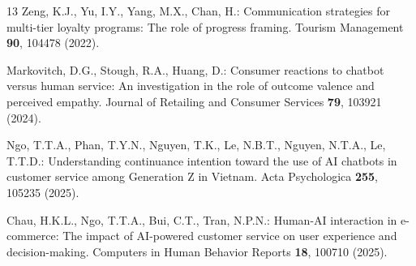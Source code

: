 \documentclass[runningheads]{llncs}
\begin{document}
\begin{thebibliography}{13}
Zeng, K.J., Yu, I.Y., Yang, M.X., Chan, H.: Communication strategies for multi-tier loyalty programs: The role of progress framing. Tourism Management \textbf{90}, 104478 (2022). 

Markovitch, D.G., Stough, R.A., Huang, D.: Consumer reactions to chatbot versus human service: An investigation in the role of outcome valence and perceived empathy. Journal of Retailing and Consumer Services \textbf{79}, 103921 (2024). 

Ngo, T.T.A., Phan, T.Y.N., Nguyen, T.K., Le, N.B.T., Nguyen, N.T.A., Le, T.T.D.: Understanding continuance intention toward the use of AI chatbots in customer service among Generation Z in Vietnam. Acta Psychologica \textbf{255}, 105235 (2025). 

Chau, H.K.L., Ngo, T.T.A., Bui, C.T., Tran, N.P.N.: Human-AI interaction in e-commerce: The impact of AI-powered customer service on user experience and decision-making. Computers in Human Behavior Reports \textbf{18}, 100710 (2025). 
\end{thebibliography}
\end{document}
